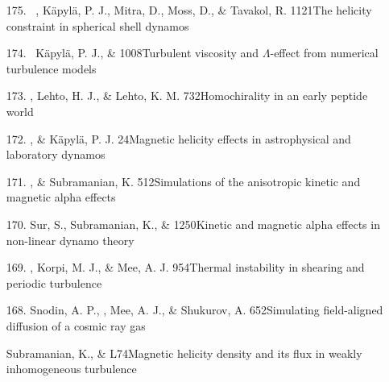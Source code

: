 \begin{itemize}
\item[{175.}~]
\Brandenburg, K\"apyl\"a, P. J., Mitra, D., Moss, D., \& Tavakol, R.
{1121}{The helicity constraint in spherical shell dynamos}

\item[{174.}~]
K\"apyl\"a, P. J., \& \Brandenburg{}
{1008}{Turbulent viscosity and $\Lambda$-effect
from numerical turbulence models}

\item[{173.}]
\Brandenburg, Lehto, H. J., \& Lehto, K. M.
{732}{Homochirality in an early peptide world}

\item[{172.}]
\Brandenburg, \& K\"apyl\"a, P. J.
{24}{Magnetic helicity effects in astrophysical and laboratory dynamos}

\item[{171.}]
\Brandenburg, \& Subramanian, K.
{512}{Simulations of the anisotropic kinetic and magnetic alpha effects}

\item[{170.}]
Sur, S., Subramanian, K., \& \Brandenburg{}
{1250}{Kinetic and magnetic alpha effects in non-linear dynamo theory}

\item[{169.}]
\Brandenburg, Korpi, M. J., \& Mee, A. J.
{954}{Thermal instability in shearing and periodic turbulence}

\item[{168.}]
Snodin, A. P., \Brandenburg, Mee, A. J., \& Shukurov, A.
{652}{Simulating field-aligned diffusion of a cosmic ray gas}

\item[\relevant {167.}]
Subramanian, K., \& \Brandenburg{}
{L74}{Magnetic helicity density and its flux in weakly inhomogeneous turbulence}


\end{itemize}
